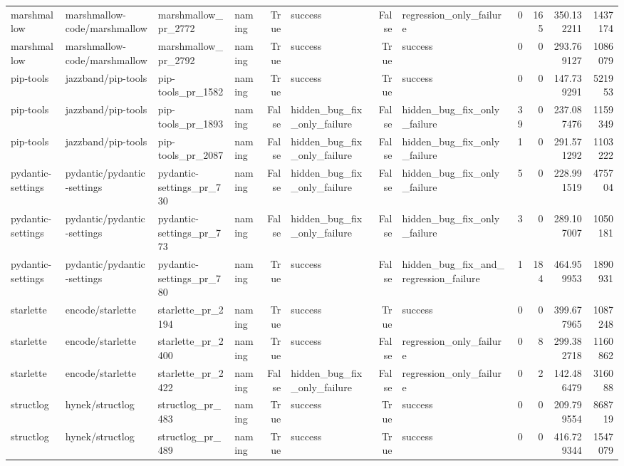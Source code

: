\begin{tabular}{llllrlrlrrrr}
marshmallow & marshmallow-code/marshmallow & marshmallow\_pr\_2772 & naming & True & success & False & regression\_only\_failure & 0 & 165 & 350.132211 & 1437174 \\
marshmallow & marshmallow-code/marshmallow & marshmallow\_pr\_2792 & naming & True & success & True & success & 0 & 0 & 293.769127 & 1086079 \\
pip-tools & jazzband/pip-tools & pip-tools\_pr\_1582 & naming & True & success & True & success & 0 & 0 & 147.739291 & 521953 \\
pip-tools & jazzband/pip-tools & pip-tools\_pr\_1893 & naming & False & hidden\_bug\_fix\_only\_failure & False & hidden\_bug\_fix\_only\_failure & 39 & 0 & 237.087476 & 1159349 \\
pip-tools & jazzband/pip-tools & pip-tools\_pr\_2087 & naming & False & hidden\_bug\_fix\_only\_failure & False & hidden\_bug\_fix\_only\_failure & 1 & 0 & 291.571292 & 1103222 \\
pydantic-settings & pydantic/pydantic-settings & pydantic-settings\_pr\_730 & naming & False & hidden\_bug\_fix\_only\_failure & False & hidden\_bug\_fix\_only\_failure & 5 & 0 & 228.991519 & 475704 \\
pydantic-settings & pydantic/pydantic-settings & pydantic-settings\_pr\_773 & naming & False & hidden\_bug\_fix\_only\_failure & False & hidden\_bug\_fix\_only\_failure & 3 & 0 & 289.107007 & 1050181 \\
pydantic-settings & pydantic/pydantic-settings & pydantic-settings\_pr\_780 & naming & True & success & False & hidden\_bug\_fix\_and\_regression\_failure & 1 & 184 & 464.959953 & 1890931 \\
starlette & encode/starlette & starlette\_pr\_2194 & naming & True & success & True & success & 0 & 0 & 399.677965 & 1087248 \\
starlette & encode/starlette & starlette\_pr\_2400 & naming & True & success & False & regression\_only\_failure & 0 & 8 & 299.382718 & 1160862 \\
starlette & encode/starlette & starlette\_pr\_2422 & naming & False & hidden\_bug\_fix\_only\_failure & False & regression\_only\_failure & 0 & 2 & 142.486479 & 316088 \\
structlog & hynek/structlog & structlog\_pr\_483 & naming & True & success & True & success & 0 & 0 & 209.799554 & 868719 \\
structlog & hynek/structlog & structlog\_pr\_489 & naming & True & success & True & success & 0 & 0 & 416.729344 & 1547079 \\

\end{tabular}
